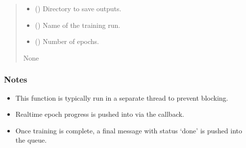 \documentclass[letterpaper,10pt,english]{sphinxmanual}
\begin{document}
\begin{fulllineitems}
\begin{quote}
\begin{description}
\begin{itemize}
\item {} 
\sphinxAtStartPar
{} (\sphinxstyleliteralemphasis{\sphinxupquote{, }}) \textendash{} Directory to save outputs.

\item {} 
\sphinxAtStartPar
{} (\sphinxstyleliteralemphasis{\sphinxupquote{, }}) \textendash{} Name of the training run.

\item {} 
\sphinxAtStartPar
{} (\sphinxstyleliteralemphasis{\sphinxupquote{, }}) \textendash{} Number of epochs.

\end{itemize}

\sphinxAtStartPar
None

\end{description}\end{quote}
\subsubsection*{Notes}
\begin{itemize}
\item {} 
\sphinxAtStartPar
This function is typically run in a separate thread to prevent blocking.

\item {} 
\sphinxAtStartPar
Real\sphinxhyphen{}time epoch progress is pushed into  via the  callback.

\item {} 
\sphinxAtStartPar
Once training is complete, a final message with status ‘done’ is pushed into the queue.

\end{itemize}

\end{fulllineitems}

\end{document}
